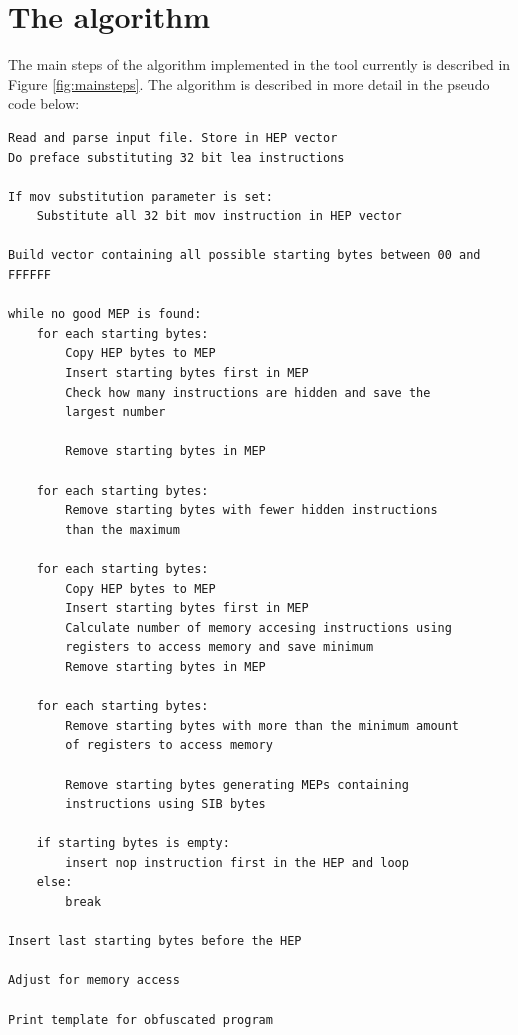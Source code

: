 \documentclass[11pt,twoside]{eitExjobb}
\begin{document}
\section{The algorithm}
The main steps of the algorithm implemented in the tool currently is described in Figure \ref{fig:mainsteps}. The algorithm is described in more detail in the pseudo code below:

\begin{Verbatim}[fontsize=\tiny]
Read and parse input file. Store in HEP vector
Do preface substituting 32 bit lea instructions

If mov substitution parameter is set:
	Substitute all 32 bit mov instruction in HEP vector

Build vector containing all possible starting bytes between 00 and FFFFFF

while no good MEP is found:
	for each starting bytes:
		Copy HEP bytes to MEP
		Insert starting bytes first in MEP
		Check how many instructions are hidden and save the 
		largest number

		Remove starting bytes in MEP

	for each starting bytes:
		Remove starting bytes with fewer hidden instructions 
		than the maximum

	for each starting bytes:
		Copy HEP bytes to MEP
		Insert starting bytes first in MEP
		Calculate number of memory accesing instructions using
		registers to access memory and save minimum
		Remove starting bytes in MEP

	for each starting bytes:
		Remove starting bytes with more than the minimum amount
		of registers to access memory 

		Remove starting bytes generating MEPs containing 
		instructions using SIB bytes

	if starting bytes is empty:
		insert nop instruction first in the HEP and loop
	else:
		break 

Insert last starting bytes before the HEP

Adjust for memory access

Print template for obfuscated program

\end{Verbatim}
\end{document}

